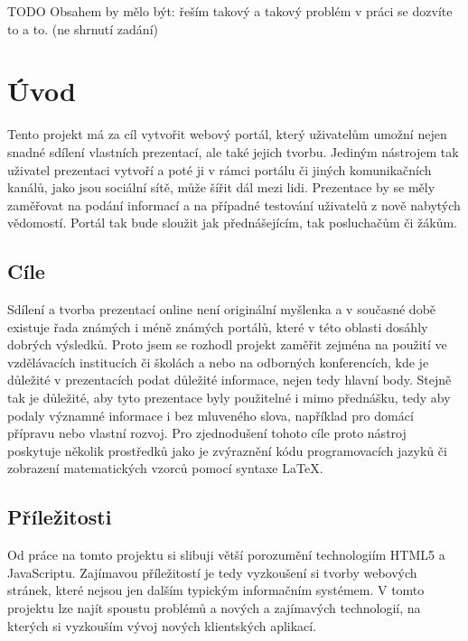 \documentclass[11pt,twoside,a4paper]{book}
\begin{document}

	\baselineskip

	\noindent
	TODO Obsahem by mělo být: řeším takový a takový problém v práci se dozvíte to a to. (ne shrnutí zadání)

	\tableofcontents		%

	\listoffigures			%

	\mainbodystarts



\chapter{Úvod}
Tento projekt má za cíl vytvořit webový portál, který uživatelům umožní nejen snadné sdílení vlastních prezentací, ale také jejich tvorbu. Jediným nástrojem tak uživatel prezentaci vytvoří a poté ji v rámci portálu či jiných komunikačních kanálů, jako jsou sociální sítě, může šířit dál mezi lidi. Prezentace by se měly zaměřovat na podání informací a na případné testování uživatelů z nově nabytých vědomostí. Portál tak bude sloužit jak přednášejícím, tak posluchačům či žákům.

\section{Cíle}
Sdílení a tvorba prezentací online není originální myšlenka a v současné době existuje řada známých i méně známých portálů, které v této oblasti dosáhly dobrých výsledků. Proto jsem se rozhodl projekt zaměřit zejména na použití ve vzdělávacích institucích či školách a nebo na odborných konferencích, kde je důležité v prezentacích podat důležité informace, nejen tedy hlavní body.
Stejně tak je důležité, aby tyto prezentace byly použitelné i mimo přednášku, tedy aby podaly významné informace i bez mluveného slova, například pro domácí přípravu nebo vlastní rozvoj. Pro zjednodušení tohoto cíle proto nástroj poskytuje několik prostředků jako je zvýraznění kódu programovacích jazyků či zobrazení matematických vzorců pomocí syntaxe \LaTeX.

\section{Příležitosti}
Od práce na tomto projektu si slibuji větší porozumění technologiím HTML5 a JavaScriptu. Zajímavou příležitostí je tedy vyzkoušení si tvorby webových stránek, které nejsou jen dalším typickým informačním systémem. V tomto projektu lze najít spoustu problémů a nových a zajímavých technologií, na kterých si vyzkouším vývoj nových klientských aplikací.
\end{document}
